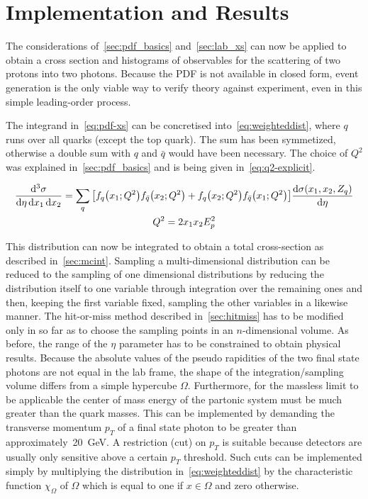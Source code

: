 
\section{Implementation and Results}%
\label{sec:pdf_results}

The considerations of~\ref{sec:pdf_basics} and~\ref{sec:lab_xs} can
now be applied to obtain a cross section and histograms of observables
for the scattering of two protons into two photons. Because the PDF is
not available in closed form, event generation is the only viable way
to verify theory against experiment, even in this simple leading-order
process.

The integrand in~\eqref{eq:pdf-xs} can be concretised
into~\eqref{eq:weighteddist}, where \(q\) runs over all quarks (except
the top quark). The sum has been symmetized, otherwise a double sum
with \(q\) and \(\bar{q}\) would have been necessary. The choice of
\(Q^2\) was explained in~\ref{sec:pdf_basics} and is being given
in~\eqref{eq:q2-explicit}.

\begin{gather}
  \label{eq:weighteddist}
  \frac{\dd[3]{\sigma}}{\dd{\eta}\dd{x_1}\dd{x_2}} =
  \sum_q \qty[f_q\qty(x_1;Q^2) f_{\bar{q}}\qty(x_2;Q^2) + f_q\qty(x_2;Q^2) f_{\bar{q}}\qty(x_1;Q^2)] \dv{\sigma(x_1,
    x_2, Z_q)}{\eta} \\
  \label{eq:q2-explicit}
  Q^2 = 2x_1x_2E_p^2
\end{gather}

This distribution can now be integrated to obtain a total
cross-section as described in~\ref{sec:mcint}. Sampling a
multi-dimensional distribution can be reduced to the sampling of one
dimensional distributions by reducing the distribution itself to one
variable through integration over the remaining ones and then, keeping
the first variable fixed, sampling the other variables in a likewise
manner. The hit-or-miss method described in~\ref{sec:hitmiss} has to
be modified only in so far as to choose the sampling points in an
\(n\)-dimensional volume. As before, the range of the \(\eta\)
parameter has to be constrained to obtain physical results. Because
the absolute values of the pseudo rapidities of the two final state
photons are not equal in the lab frame, the shape of the
integration/sampling volume differs from a simple
hypercube \(\Omega\). Furthermore, for the massless limit to be applicable the
center of mass energy of the partonic system must be much greater than
the quark masses. This can be implemented by demanding the
transverse momentum \(p_T\) of a final state photon to be greater than
approximately~\SI{20}{\giga\electronvolt}. A restriction (cut) on
\(p_T\) is suitable because detectors are usually only sensitive above
a certain \(p_T\) threshold. %
Such cuts can be implemented simply by multiplying the distribution
in~\eqref{eq:weighteddist} by the characteristic function
\(\chi_\Omega\) of \(\Omega\) which is equal to one if \(x\in\Omega\)
and zero otherwise.

